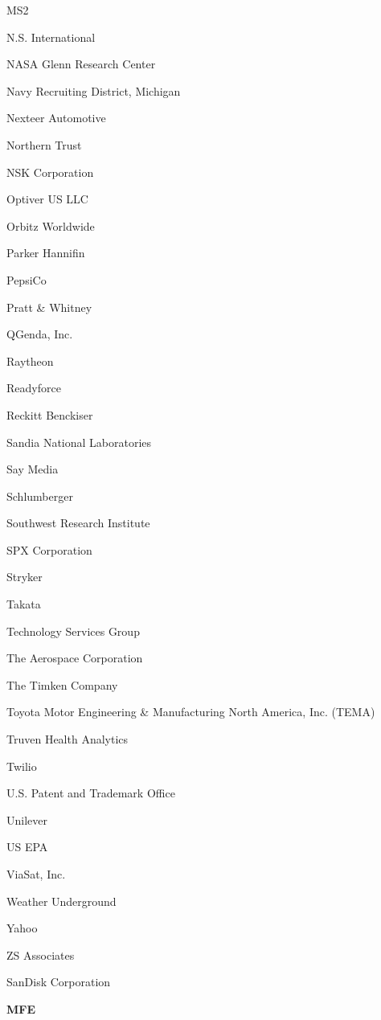 \documentclass[twoside]{article}
\begin{document}
\begin{center}
\begin{multicols}{5}
\begin{FlushLeft}
\begin{compactitem}
\item MS2
\item N.S. International
\item NASA Glenn Research Center
\item Navy Recruiting District, Michigan
\item Nexteer Automotive
\item Northern Trust
\item NSK Corporation
\item Optiver US LLC
\item Orbitz Worldwide
\item Parker Hannifin
\item PepsiCo
\item Pratt \& Whitney
\item QGenda, Inc.
\item Raytheon
\item Readyforce
\item Reckitt Benckiser
\item Sandia National Laboratories
\item Say Media
\item Schlumberger
\item Southwest Research Institute
\item SPX Corporation
\item Stryker
\item Takata
\item Technology Services Group
\item The Aerospace Corporation
\item The Timken Company
\item Toyota Motor Engineering \& Manufacturing North America, Inc. (TEMA)
\item Truven Health Analytics
\item Twilio
\item U.S. Patent and Trademark Office
\item Unilever
\item US EPA
\item ViaSat, Inc.
\item Weather Underground
\item Yahoo
\item ZS Associates
\item SanDisk Corporation
\end{compactitem}
        \end{FlushLeft}
        \vspace{1em}
        {\fontsize{14}{16}\selectfont \bf MFE}\\

\end{multicols}
\end{center}
\end{document}
